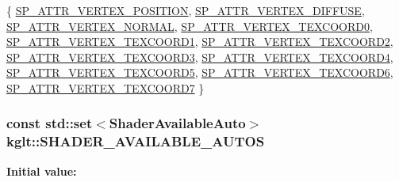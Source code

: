 \begin{DoxyCode}
 \{
    \hyperlink{namespacekglt_a402d09e4a0c30dbb100d563c0a3d945aaa2ca1b2275ef87e9256be7dbfadeb5c4}{SP\_ATTR\_VERTEX\_POSITION},
    \hyperlink{namespacekglt_a402d09e4a0c30dbb100d563c0a3d945aa0c75095f640f0f6cc05b3f321647c795}{SP\_ATTR\_VERTEX\_DIFFUSE},
    \hyperlink{namespacekglt_a402d09e4a0c30dbb100d563c0a3d945aa0d3570874a02b8b9dea67e61ce9e30ca}{SP\_ATTR\_VERTEX\_NORMAL},
    \hyperlink{namespacekglt_a402d09e4a0c30dbb100d563c0a3d945aa81e8ec5615467df7c39b60aa82f8592c}{SP\_ATTR\_VERTEX\_TEXCOORD0},
    \hyperlink{namespacekglt_a402d09e4a0c30dbb100d563c0a3d945aa71652702bf9363bcdd5f91672c5816b7}{SP\_ATTR\_VERTEX\_TEXCOORD1},
    \hyperlink{namespacekglt_a402d09e4a0c30dbb100d563c0a3d945aae697dcc8b45dea2a9fe4c744948e87cf}{SP\_ATTR\_VERTEX\_TEXCOORD2},
    \hyperlink{namespacekglt_a402d09e4a0c30dbb100d563c0a3d945aa11e72154c74c3c7d7db5c1131be62dcf}{SP\_ATTR\_VERTEX\_TEXCOORD3},
    \hyperlink{namespacekglt_a402d09e4a0c30dbb100d563c0a3d945aa0b935f20e1a6585368dc6b106eb9bf30}{SP\_ATTR\_VERTEX\_TEXCOORD4},
    \hyperlink{namespacekglt_a402d09e4a0c30dbb100d563c0a3d945aaf8ce012293ef38dc8be6fee43014c86e}{SP\_ATTR\_VERTEX\_TEXCOORD5},
    \hyperlink{namespacekglt_a402d09e4a0c30dbb100d563c0a3d945aa88b139edb62066d196cb198e121de857}{SP\_ATTR\_VERTEX\_TEXCOORD6},
    \hyperlink{namespacekglt_a402d09e4a0c30dbb100d563c0a3d945aa1305f2421d23f4121e11eed0afe12c85}{SP\_ATTR\_VERTEX\_TEXCOORD7}
\}
\end{DoxyCode}
\hypertarget{namespacekglt_a609c90644c4f40d0819f5ad8bab2ca3a}{
\subsubsection[{S\-H\-A\-D\-E\-R\-\_\-\-A\-V\-A\-I\-L\-A\-B\-L\-E\-\_\-\-A\-U\-T\-O\-S}]{\setlength{\rightskip}{0pt plus 5cm}const std\-::set$<${\bf Shader\-Available\-Auto}$>$ kglt\-::\-S\-H\-A\-D\-E\-R\-\_\-\-A\-V\-A\-I\-L\-A\-B\-L\-E\-\_\-\-A\-U\-T\-O\-S}}\label{namespacekglt_a609c90644c4f40d0819f5ad8bab2ca3a}
{\bfseries Initial value\-:}
